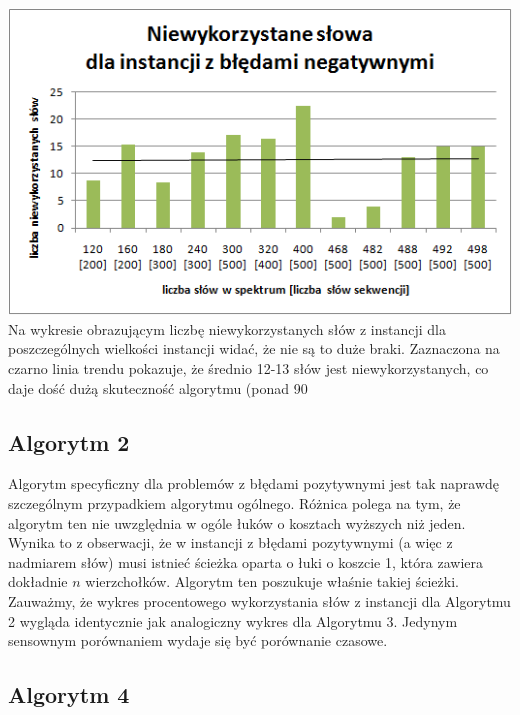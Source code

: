 \documentclass[a4paper]{article}
\begin{document}
\includegraphics{unusedWords_general_negative.png}
Na wykresie obrazującym liczbę niewykorzystanych słów z instancji dla poszczególnych wielkości instancji widać, że nie są to duże braki. Zaznaczona na czarno linia trendu pokazuje, że średnio 12-13 słów jest niewykorzystanych, co daje dość dużą skuteczność algorytmu (ponad 90%

\subsection{Algorytm 2}

Algorytm specyficzny dla problemów z błędami pozytywnymi jest tak naprawdę szczególnym przypadkiem algorytmu ogólnego. Różnica polega na tym, że algorytm ten nie uwzględnia w ogóle łuków o kosztach wyższych niż jeden. Wynika to z obserwacji, że w instancji z błędami pozytywnymi (a więc z nadmiarem słów) musi istnieć ścieżka oparta o łuki o koszcie 1, która zawiera dokładnie $n$ wierzchołków. Algorytm ten poszukuje właśnie takiej ścieżki. Zauważmy, że wykres procentowego wykorzystania słów z instancji dla Algorytmu 2 wygląda identycznie jak analogiczny wykres dla Algorytmu 3. Jedynym sensownym porównaniem wydaje się być porównanie czasowe.

\subsection{Algorytm 4}
\end{document}
